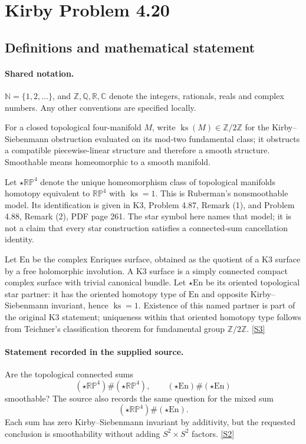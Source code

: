 \documentclass[11pt]{article}
\newcommand{\sref}[2]{\hyperlink{source:#1:#2}{[S#2]}}
\begin{document}
\section{Kirby Problem 4.20}\label{statement}

\subsection{Definitions and mathematical statement}

\paragraph{Shared notation.}$\mathbb N=\{1,2,\ldots\}$, and $\mathbb Z,\mathbb Q,\mathbb R,\mathbb C$ denote the integers, rationals, reals and complex numbers. Any other conventions are specified locally.


For a closed topological four-manifold $M$, write $\operatorname{ks}(M)\in\mathbb Z/2\mathbb Z$ for the Kirby--Siebenmann obstruction evaluated on its mod-two fundamental class; it obstructs a compatible piecewise-linear structure and therefore a smooth structure. Smoothable means homeomorphic to a smooth manifold.

Let $\star\mathbb{RP}^4$ denote the unique homeomorphism class of topological manifolds homotopy equivalent to $\mathbb{RP}^4$ with $\operatorname{ks}=1$. This is Ruberman's nonsmoothable model. Its identification is given in K3, Problem 4.87, Remark (1), and Problem 4.88, Remark (2), PDF page 261. The star symbol here names that model; it is not a claim that every star construction satisfies a connected-sum cancellation identity.

Let $\mathrm{En}$ be the complex Enriques surface, obtained as the quotient of a K3 surface by a free holomorphic involution. A K3 surface is a simply connected compact complex surface with trivial canonical bundle. Let $\star\mathrm{En}$ be its oriented topological star partner: it has the oriented homotopy type of $\mathrm{En}$ and opposite Kirby--Siebenmann invariant, hence $\operatorname{ks}=1$. Existence of this named partner is part of the original K3 statement; uniqueness within that oriented homotopy type follows from Teichner's classification theorem for fundamental group $\mathbb Z/2\mathbb Z$. \sref{statement}{3}
\paragraph{Statement recorded in the supplied source.}
Are the topological connected sums
\[
(\star\mathbb{RP}^4)\#(\star\mathbb{RP}^4),\qquad
(\star\mathrm{En})\#(\star\mathrm{En})
\]
smoothable? The source also records the same question for the mixed sum
\[
(\star\mathbb{RP}^4)\#(\star\mathrm{En}).
\]
Each sum has zero Kirby--Siebenmann invariant by additivity, but the requested conclusion is smoothability without adding $S^2\times S^2$ factors. \sref{statement}{2}
\end{document}

